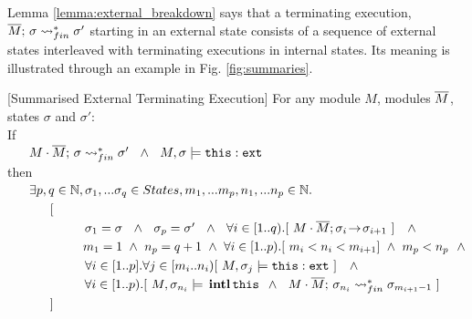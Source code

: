 Lemma \ref{lemma:external_breakdown} says that a terminating execution,  $ \overline{M};\, {\sigma} \rightsquigarrow^*_{fin} \sigma'$ starting in an external state  consists of a sequence of  external states interleaved with terminating executions in internal states. 
Its meaning %
is illustrated through an example in Fig. \ref{fig:summaries}.

 
\begin{auxLemma}
\label{lemma:external_breakdown}[Summarised External Terminating Execution]
For any module $M$, modules $\overline{M}$, states $\sigma$ and $\sigma'$:
\\
If \\
$\strut \ \ \ \ \ M\cdot \overline{M};\, {\sigma} \rightsquigarrow^*_{fin} \sigma' \ \ \wedge  \ \ M,\sigma \models \texttt{this}:\mbox{\normalfont{\texttt{ext}}}$
\\
then
\\
$\strut \ \ \ \ \ \exists p,q\in \mathbb{N},  \sigma_1, ... \sigma_q \in States, m_1,...m_p, n_1, ... n_p \in \mathbb{N}.$\\  
$\strut \ \ \ \ \ \ \ \ \ \ [  $ \\
$\strut \ \ \ \ \ \ \ \ \ \  \ \ \ \ \ \ \ \ \sigma_1=\sigma \ \ \wedge\ \  \sigma_p=\sigma'\ \  \wedge\ \ \forall i\in [1..q).[\   \leadstoOrig {M\cdot \Mtwo}  {\sigma_i}  {\sigma_{i+1}}\  ] \  \ \ \wedge$\\
$\strut \ \ \ \ \ \ \ \ \ \  \ \ \ \ \ \ \ \ m_1=1 \ \wedge\ n_p=q+1 \  \wedge\ \forall i\in[1..p).[  \  m_i < n_i < m_{i+1}  ] \ \wedge \ m_p<n_p\ \ \wedge  $\\
$\strut \ \ \ \ \ \ \ \ \ \  \ \ \ \ \ \ \ \ \forall i\in[1..p].\forall j\in [m_i..n_i)[\   M,\sigma_j \models \external {\texttt{this}} \ ] \  \ \ \wedge$\\
$\strut \ \ \ \ \ \ \ \ \ \  \ \ \ \ \ \ \ \ \forall i\in[1..p). [ \ M,\sigma_{n_i} \models \internal {\texttt{this}}   \ \wedge \ \ 
 \leadstoBoundedStarFin {M\cdot \Mtwo}  {\sigma_{n_{i}}}  {\sigma_{m_{i+1}-1}} \ ] $ \\
$\strut \ \ \ \ \ \ \ \ \ \ ]$
\end{auxLemma}



